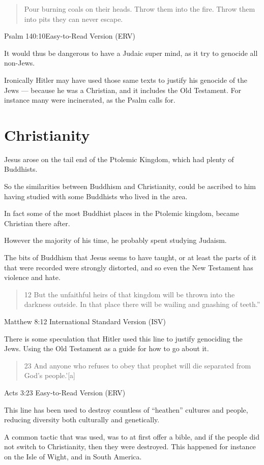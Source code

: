 \blockquote{Pour burning coals on their heads.
    Throw them into the fire.
    Throw them into pits they can never escape.
}{Psalm 140:10Easy-to-Read Version (ERV)}

It would thus be dangerous to have a Judaic super mind, 
as it try to genocide all non-Jews. 

Ironically Hitler may have used those same texts to justify his genocide of the
Jews --- because he was a Christian, and it includes the Old Testament. For
instance many were incinerated, as the Psalm calls for. 

\chapter{Christianity}
Jesus arose on the tail end of the Ptolemic Kingdom, 
which had plenty of Buddhists.  

So the similarities between Buddhism and Christianity,
could be ascribed to him having studied with some Buddhists who lived in the
area. 

In fact some of the most Buddhist places in the Ptolemic kingdom,
 became Christian there after. 

However the majority of his time, he probably spent studying Judaism.

The bits of Buddhism that Jesus seems to have taught, or at least the
parts of it that were recorded were strongly distorted, and so even the New
Testament has violence and hate.

\blockquote{12 But the unfaithful heirs of that kingdom will be thrown into
the darkness outside. In that place there will be wailing and gnashing of
teeth.”
} {Matthew 8:12 International Standard Version (ISV)}

There is some speculation that Hitler used this line to justify genociding
the Jews. Using the Old Testament as a guide for how to go about it.

\blockquote{23 And anyone who refuses to obey that prophet will die separated
from God’s people.’[a] }{Acts 3:23 Easy-to-Read Version (ERV)}

This line has been used to destroy countless of ``heathen'' cultures and people,
 reducing diversity both culturally and genetically. 

A common tactic that was used, was to at first offer a bible, and if the people
did not switch to Christianity, then they were destroyed.  This happened for 
instance on the Isle of Wight, and in South America.

